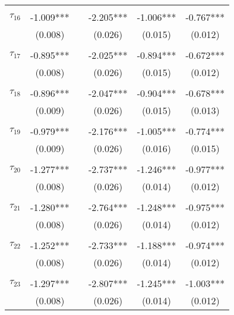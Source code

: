 \begin{tabular}{@{\extracolsep{-0pt}}lccccc}
                &           &&           &           &           \\[-2.1ex]
$\tau_{16}$     & -1.009*** && -2.205*** & -1.006*** & -0.767*** \\
                &  (0.008)  &&  (0.026)  &  (0.015)  &  (0.012)  \\
                &           &&           &           &           \\[-2.1ex]
$\tau_{17}$     & -0.895*** && -2.025*** & -0.894*** & -0.672*** \\
                &  (0.008)  &&  (0.026)  &  (0.015)  &  (0.012)  \\
                &           &&           &           &           \\[-2.1ex]
$\tau_{18}$     & -0.896*** && -2.047*** & -0.904*** & -0.678*** \\
                &  (0.009)  &&  (0.026)  &  (0.015)  &  (0.013)  \\
                &           &&           &           &           \\[-2.1ex]
$\tau_{19}$     & -0.979*** && -2.176*** & -1.005*** & -0.774*** \\
                &  (0.009)  &&  (0.026)  &  (0.016)  &  (0.015)  \\
                &           &&           &           &           \\[-2.1ex]
$\tau_{20}$     & -1.277*** && -2.737*** & -1.246*** & -0.977*** \\
                &  (0.008)  &&  (0.026)  &  (0.014)  &  (0.012)  \\
                &           &&           &           &           \\[-2.1ex]
$\tau_{21}$     & -1.280*** && -2.764*** & -1.248*** & -0.975*** \\
                &  (0.008)  &&  (0.026)  &  (0.014)  &  (0.012)  \\
                &           &&           &           &           \\[-2.1ex]
$\tau_{22}$     & -1.252*** && -2.733*** & -1.188*** & -0.974*** \\
                &  (0.008)  &&  (0.026)  &  (0.014)  &  (0.012)  \\
                &           &&           &           &           \\[-2.1ex]
$\tau_{23}$     & -1.297*** && -2.807*** & -1.245*** & -1.003*** \\
                &  (0.008)  &&  (0.026)  &  (0.014)  &  (0.012)  \\

\end{tabular}
